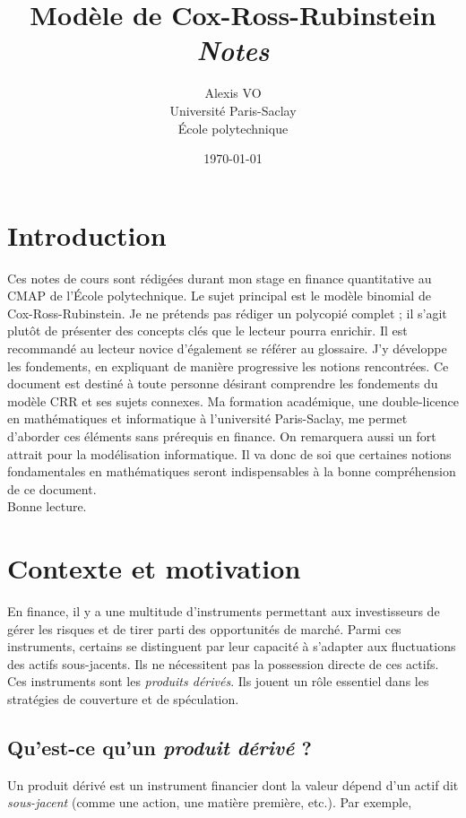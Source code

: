 \documentclass[12pt,a4paper]{article}
\title{\Huge{\textbf{Modèle de Cox-Ross-Rubinstein}}\\ \medskip
      \Huge{\textit{Notes}}\vspace*{0.7cm}}
\author{\LARGE{Alexis VO}\vspace{1cm}\\ \medskip
      Université Paris-Saclay\\École polytechnique}
\date{\vspace{0.2cm}\today}
\begin{document}
\renewcommand\labelitemi{\textbullet}

\maketitle

\newpage

\section*{Introduction}
Ces notes de cours sont rédigées durant mon stage en finance quantitative au CMAP de l'École polytechnique. Le sujet principal est le modèle binomial de Cox-Ross-Rubinstein. Je ne prétends pas rédiger un polycopié complet ; il s'agit plutôt de présenter des concepts clés que le lecteur pourra enrichir. Il est recommandé au lecteur novice d'également se référer au glossaire. J'y développe les fondements, en expliquant de manière progressive les notions rencontrées.  Ce document est destiné à toute personne désirant comprendre les fondements du modèle CRR et ses sujets connexes. Ma formation académique, une double-licence en mathématiques et informatique à l'université Paris-Saclay, me permet d'aborder ces éléments sans prérequis en finance. On remarquera aussi un fort attrait pour la modélisation informatique. Il va donc de soi que certaines notions fondamentales en mathématiques seront indispensables à la bonne compréhension de ce document.\\Bonne lecture.

\newpage

\tableofcontents

\newpage

\section{Contexte et motivation}
En finance, il y a une multitude d'instruments permettant aux investisseurs de gérer les risques et de tirer parti des opportunités de marché. Parmi ces instruments, certains se distinguent par leur capacité à s'adapter aux fluctuations des actifs sous-jacents. Ils ne nécessitent pas la possession directe de ces actifs. Ces instruments sont les \textit{produits dérivés}. Ils jouent un rôle essentiel dans les stratégies de couverture et de spéculation.

\subsection{Qu'est-ce qu'un \textit{produit dérivé} ?}
Un produit dérivé est un instrument financier dont la valeur dépend d'un actif dit \textit{sous-jacent} (comme une action, une matière première, etc.). Par exemple,
\end{document}
